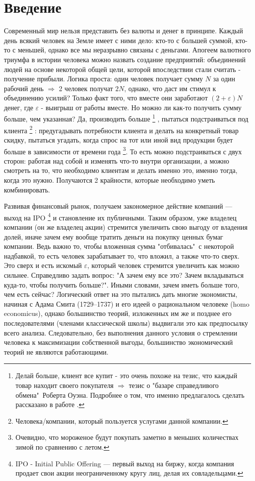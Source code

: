 \section{Введение} 
	Современный мир нельзя представить без валюты и денег в принципе. Каждый день всякий человек на Земле имеет с ними дело: кто-то с большей суммой, кто-то с меньшей, однако все мы неразрывно связаны с деньгами. Апогеем валютного триумфа в истории человека можно назвать создание предприятий: объединений людей на основе некоторой общей цели, которой впоследствии стали считать - получение прибыли. Логика проста: один человек получает сумму $N$ за один рабочий день $\Rightarrow$ 2 человек получат $2N$, однако, что даст им стимул к объединению усилий? Только факт того, что вместе они заработают $(2 + \varepsilon)N$ денег, где $\varepsilon$ - выигрыш от работы вместе. Но можно ли как-то получить сумму больше, чем указанная? Да, производить больше \footnote{Делай больше, клиент все купит - это очень похоже на тезис, что каждый товар находит своего покупателя $\Rightarrow$ тезис о "базаре справедливого обмена"\ Роберта Оуэна. Подробнее о том, что именно предлагалось сделать рассказано в работе \cite{ropert_ouwen}.} , пытаться подстраиваться под клиента \footnote{Человека/компании, который пользуется услугами данной компании.} : предугадывать потребности клиента и делать на конкретный товар скидку, пытаться угадать, когда спрос на тот или иной вид продукции будет больше в зависимости от времени года \footnote{Очевидно, что мороженое будут покупать заметно в меньших количествах зимой по сравнению с летом.}. То есть можно подстраиваться с двух сторон: работая над собой и изменять что-то внутри организации, а можно смотреть на то, что необходимо клиентам и делать именно это, именно тогда, когда это нужно. Получаются 2 крайности, которые необходимо уметь комбинировать. 
	
	Развивая финансовый рынок, получаем закономерное действие компаний --- выход на IPO \footnote{IPO - Initial Public Offering --- первый выход на биржу, когда компания продает свои акции неограниченному кругу лиц, делая их совладельцами.} и становление их публичными. Таким образом, уже владелец компании (он же владелец акции) стремится увеличить свою выгоду от владения долей, иначе зачем ему вообще тратить деньги на покупку ценных бумаг компании. Ведь важно то, чтобы вложенная сумма "отбивалась"\ с некоторой надбавкой, то есть человек зарабатывает то, что вложил, а также что-то сверх. Это сверх и есть искомый $\varepsilon$, который человек стремится увеличить как можно сильнее. Справедливо задать вопрос: "А зачем ему все это? Зачем вкладываться куда-то, чтобы получить больше?". Иными словами, зачем иметь больше того, чем есть сейчас? Логический ответ на это пытались дать многие экономисты, начиная с Адама Смита (1729–1737) \cite{adam_smith} и его идеей о рациональном человеке (homo economicus), однако большинство теорий, изложенных им же и позднее его последователями (членами классической школы) выдвигали это как предпосылку всего анализа. Следовательно, без выполнения данного условия о стремлении человека к максимизации собственной выгоды, большинство экономический теорий не являются работающими.
	
